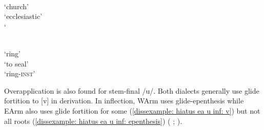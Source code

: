 \begin{exe}
	
	\ex 
	\begin{multicols}{2}
		\begin{xlist}
			
			\ex {}\label{dissexample: hiatus ea i inf: delete}\\
			`church'\\
			`ecclesiastic'\\
			`
			
			\ex {}\label{dissexample: hiatus ea i inf: epenthesis}\\
			`ring'\\
			`to seal'\\
			`ring-\textsc{inst}'
		\end{xlist}
		
	\end{multicols}
	
\end{exe}

Overapplication is also found  for stem-final  /u/. Both dialects generally use glide fortition to [v] in derivation.  In inflection, WArm uses glide-epenthesis while EArm also uses glide fortition for some  (\ref{dissexample: hiatus ea u inf: v}) but not all roots (\ref{dissexample: hiatus ea u inf: epenthesis}) (\citeauthor{Minassian-1980-EastArmenianGrammar} \citeyear[95]{Minassian-1980-EastArmenianGrammar}; \citeauthor{Margaryan-1997-ArmenianPhonology} \citeyear[103-7]{Margaryan-1997-ArmenianPhonology}).  




